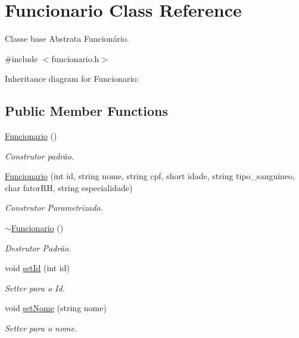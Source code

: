 \hypertarget{classFuncionario}{}\section{Funcionario Class Reference}
\label{classFuncionario}


Classe base Abstrata Funcionário.  




{\ttfamily \#include $<$funcionario.\+h$>$}



Inheritance diagram for Funcionario\+:
\subsection*{Public Member Functions}
\begin{DoxyCompactItemize}
\item 
\hyperlink{classFuncionario_a7cd39b2c6cd2449162481a8c0e7a2429}{Funcionario} ()
\begin{DoxyCompactList}\small\item\em Construtor padrão. \end{DoxyCompactList}\item 
\hyperlink{classFuncionario_a918cf5f76da6007332303861d37416fd}{Funcionario} (int id, string nome, string cpf, short idade, string tipo\+\_\+sanguineo, char fator\+RH, string especialidade)
\begin{DoxyCompactList}\small\item\em Construtor Parametrizado. \end{DoxyCompactList}\item 
\hyperlink{classFuncionario_a800273bd909dc88f821a414abebc442c}{$\sim$\+Funcionario} ()
\begin{DoxyCompactList}\small\item\em Destrutor Padrão. \end{DoxyCompactList}\item 
void \hyperlink{classFuncionario_acc0b430d08b2c459682d7bb01c0ab1c4}{set\+Id} (int id)
\begin{DoxyCompactList}\small\item\em Setter para o Id. \end{DoxyCompactList}\item 
void \hyperlink{classFuncionario_aa7876648c2ad5e3f4d3befcabcce0b1c}{set\+Nome} (string nome)
\begin{DoxyCompactList}\small\item\em Setter para o nome. \end{DoxyCompactList}\item 

\end{DoxyCompactItemize}
